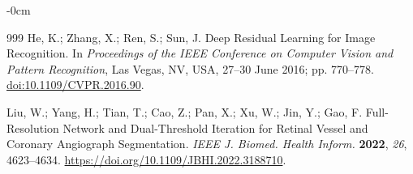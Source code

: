 \documentclass[jimaging,article,submit,pdftex,moreauthors]{Definitions/mdpi}
\begin{document}
\begin{adjustwidth}{-\extralength}{0cm}
\begin{thebibliography}{999}
He, K.; Zhang, X.; Ren, S.; Sun, J. Deep Residual Learning for Image Recognition.
In \textit{Proceedings of the IEEE Conference on Computer Vision and Pattern Recognition},
Las Vegas, NV, USA, 27--30 June 2016; pp. 770--778.
\href{https://doi.org/10.1109/CVPR.2016.90}{doi:10.1109/CVPR.2016.90}.

Liu, W.; Yang, H.; Tian, T.; Cao, Z.; Pan, X.; Xu, W.; Jin, Y.; Gao, F.
Full-Resolution Network and Dual-Threshold Iteration for Retinal Vessel and Coronary Angiograph Segmentation.
\textit{IEEE J. Biomed. Health Inform.} \textbf{2022}, \textit{26}, 4623--4634.
\url{https://doi.org/10.1109/JBHI.2022.3188710}.

\end{thebibliography}
\PublishersNote{}\end{adjustwidth}
\end{document}

